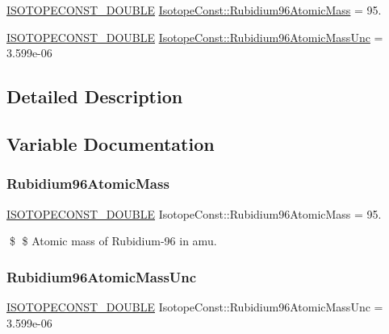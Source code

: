 \begin{DoxyCompactItemize}
\item 
\mbox{\hyperlink{group___isotope_const-_macros_ga8f45a7272ce02c0b4c65c44636ed719a}{I\+S\+O\+T\+O\+P\+E\+C\+O\+N\+S\+T\+\_\+\+D\+O\+U\+B\+LE}} \mbox{\hyperlink{group___isotope_const-_rubidium-_rb96_ga48f7c1d545ac3fd132080f994690fd2c}{Isotope\+Const\+::\+Rubidium96\+Atomic\+Mass}} = 95.
\item 
\mbox{\hyperlink{group___isotope_const-_macros_ga8f45a7272ce02c0b4c65c44636ed719a}{I\+S\+O\+T\+O\+P\+E\+C\+O\+N\+S\+T\+\_\+\+D\+O\+U\+B\+LE}} \mbox{\hyperlink{group___isotope_const-_rubidium-_rb96_ga276a21e85d42024f390df7f00a4d0d2e}{Isotope\+Const\+::\+Rubidium96\+Atomic\+Mass\+Unc}} = 3.\+599e-\/06
\end{DoxyCompactItemize}


\subsection{Detailed Description}


\subsection{Variable Documentation}
\mbox{\label{group___isotope_const-_rubidium-_rb96_ga48f7c1d545ac3fd132080f994690fd2c}} 
\subsubsection{\texorpdfstring{Rubidium96\+Atomic\+Mass}{Rubidium96AtomicMass}}
{\footnotesize\ttfamily \mbox{\hyperlink{group___isotope_const-_macros_ga8f45a7272ce02c0b4c65c44636ed719a}{I\+S\+O\+T\+O\+P\+E\+C\+O\+N\+S\+T\+\_\+\+D\+O\+U\+B\+LE}} Isotope\+Const\+::\+Rubidium96\+Atomic\+Mass = 95.}

\$ \$ Atomic mass of Rubidium-\/96 in amu. \mbox{\label{group___isotope_const-_rubidium-_rb96_ga276a21e85d42024f390df7f00a4d0d2e}} 
\subsubsection{\texorpdfstring{Rubidium96\+Atomic\+Mass\+Unc}{Rubidium96AtomicMassUnc}}
{\footnotesize\ttfamily \mbox{\hyperlink{group___isotope_const-_macros_ga8f45a7272ce02c0b4c65c44636ed719a}{I\+S\+O\+T\+O\+P\+E\+C\+O\+N\+S\+T\+\_\+\+D\+O\+U\+B\+LE}} Isotope\+Const\+::\+Rubidium96\+Atomic\+Mass\+Unc = 3.\+599e-\/06}

